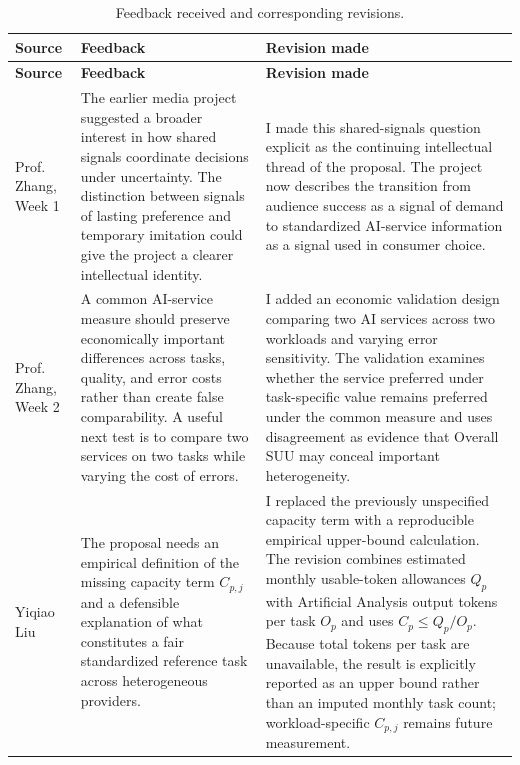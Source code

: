 \documentclass[sigconf,nonacm]{acmart}
\begin{document}
\vspace{0.5em}

\renewcommand{\arraystretch}{1.18}

\begin{longtable}{
@{}
p{}
p{}
p{}
@{}
}

\caption{Feedback received and corresponding revisions.}
\label{tab:review-revisions}
\\

\toprule
\textbf{Source}
&
\textbf{Feedback}
&
\textbf{Revision made}
\\
\midrule
\endfirsthead

\toprule
\textbf{Source}
&
\textbf{Feedback}
&
\textbf{Revision made}
\\
\midrule
\endhead

\bottomrule
\endfoot

Prof. Zhang,
Week 1
&
The earlier media project suggested a broader interest in how shared signals
coordinate decisions under uncertainty. The distinction between signals of
lasting preference and temporary imitation could give the project a clearer
intellectual identity.
&
I made this shared-signals question explicit as the continuing intellectual
thread of the proposal. The project now describes the transition from audience
success as a signal of demand to standardized AI-service information as a signal
used in consumer choice.
\\

\addlinespace

Prof. Zhang,
Week 2
&
A common AI-service measure should preserve economically important differences
across tasks, quality, and error costs rather than create false comparability.
A useful next test is to compare two services on two tasks while varying the
cost of errors.
&
I added an economic validation design comparing two AI services across two
workloads and varying error sensitivity. The validation examines whether the
service preferred under task-specific value remains preferred under the common
measure and uses disagreement as evidence that Overall SUU may conceal
important heterogeneity.
\\

\addlinespace

Yiqiao Liu
&
The proposal needs an empirical definition of the missing capacity term
$C_{p,j}$ and a defensible explanation of what constitutes a fair standardized
reference task across heterogeneous providers.
&
I replaced the previously unspecified capacity term with a reproducible
empirical upper-bound calculation. The revision combines estimated monthly
usable-token allowances $Q_p$ with Artificial Analysis output tokens per task
$O_p$ and uses $C_p\le Q_p/O_p$. Because total tokens per task are unavailable,
the result is explicitly reported as an upper bound rather than an imputed
monthly task count; workload-specific $C_{p,j}$ remains future measurement.
\\


\end{longtable}
\end{document}
